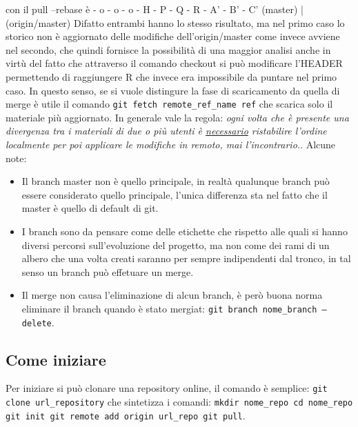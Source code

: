con il pull --rebase è
- o - o - o - H - P - Q - R - A' - B' - C' (master)
                          |
                          (origin/master)
Difatto entrambi hanno lo stesso risultato, ma nel primo caso lo storico non è aggiornato delle modifiche dell'origin/master  come invece avviene nel secondo, che quindi fornisce la possibilità di una maggior analisi anche in virtù del fatto che attraverso il comando checkout si può modificare l'HEADER permettendo di raggiungere R che invece era impossibile da puntare nel primo caso.
In questo senso, se si vuole distingure la fase di scaricamento da quella di merge è utile il comando \texttt{git fetch remote\_ref\_name ref} che scarica solo il materiale più aggiornato. 
In generale vale la regola: \emph{ogni volta che è presente una divergenza tra i materiali di due o più utenti è \underline{necessario} ristabilire l'ordine localmente per poi applicare le modifiche in remoto, mai l'incontrario.}. 
Alcune note: 
\begin{itemize}
    \item Il branch master non è quello principale, in realtà qualunque branch può essere considerato quello principale, l'unica differenza sta nel fatto che il master è quello di default di git.
    \item I branch sono da pensare come delle etichette che rispetto alle quali si hanno diversi percorsi sull'evoluzione del progetto, ma non come dei rami di un albero che una volta creati saranno per sempre indipendenti dal tronco, in tal senso un branch può effetuare un merge. 
    \item Il merge non causa l'eliminazione di alcun branch, è però buona norma eliminare il branch quando è stato mergiat: \texttt{git branch nome\_branch --delete}.
\end{itemize}

\subsection{Come iniziare}
Per iniziare si può clonare una repository online, il comando è semplice:
\texttt{git clone url\_repository} che sintetizza i comandi:
\texttt{mkdir nome\_repo cd nome\_repo git init git remote add origin url\_repo git pull}.
